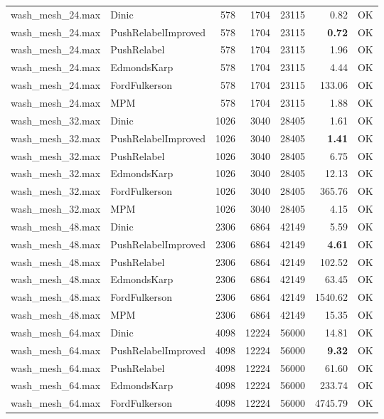 \begin{longtable}{llrrrrl}
\midrule
wash\_mesh\_24.max & Dinic & 578 & 1704 & 23115 & 0.82 & OK \\
wash\_mesh\_24.max & PushRelabelImproved & 578 & 1704 & 23115 & \textbf{0.72} & OK \\
wash\_mesh\_24.max & PushRelabel & 578 & 1704 & 23115 & 1.96 & OK \\
wash\_mesh\_24.max & EdmondsKarp & 578 & 1704 & 23115 & 4.44 & OK \\
wash\_mesh\_24.max & FordFulkerson & 578 & 1704 & 23115 & 133.06 & OK \\
wash\_mesh\_24.max & MPM & 578 & 1704 & 23115 & 1.88 & OK \\
\midrule
wash\_mesh\_32.max & Dinic & 1026 & 3040 & 28405 & 1.61 & OK \\
wash\_mesh\_32.max & PushRelabelImproved & 1026 & 3040 & 28405 & \textbf{1.41} & OK \\
wash\_mesh\_32.max & PushRelabel & 1026 & 3040 & 28405 & 6.75 & OK \\
wash\_mesh\_32.max & EdmondsKarp & 1026 & 3040 & 28405 & 12.13 & OK \\
wash\_mesh\_32.max & FordFulkerson & 1026 & 3040 & 28405 & 365.76 & OK \\
wash\_mesh\_32.max & MPM & 1026 & 3040 & 28405 & 4.15 & OK \\
\midrule
wash\_mesh\_48.max & Dinic & 2306 & 6864 & 42149 & 5.59 & OK \\
wash\_mesh\_48.max & PushRelabelImproved & 2306 & 6864 & 42149 & \textbf{4.61} & OK \\
wash\_mesh\_48.max & PushRelabel & 2306 & 6864 & 42149 & 102.52 & OK \\
wash\_mesh\_48.max & EdmondsKarp & 2306 & 6864 & 42149 & 63.45 & OK \\
wash\_mesh\_48.max & FordFulkerson & 2306 & 6864 & 42149 & 1540.62 & OK \\
wash\_mesh\_48.max & MPM & 2306 & 6864 & 42149 & 15.35 & OK \\
\midrule
wash\_mesh\_64.max & Dinic & 4098 & 12224 & 56000 & 14.81 & OK \\
wash\_mesh\_64.max & PushRelabelImproved & 4098 & 12224 & 56000 & \textbf{9.32} & OK \\
wash\_mesh\_64.max & PushRelabel & 4098 & 12224 & 56000 & 61.60 & OK \\
wash\_mesh\_64.max & EdmondsKarp & 4098 & 12224 & 56000 & 233.74 & OK \\
wash\_mesh\_64.max & FordFulkerson & 4098 & 12224 & 56000 & 4745.79 & OK \\

\end{longtable}
